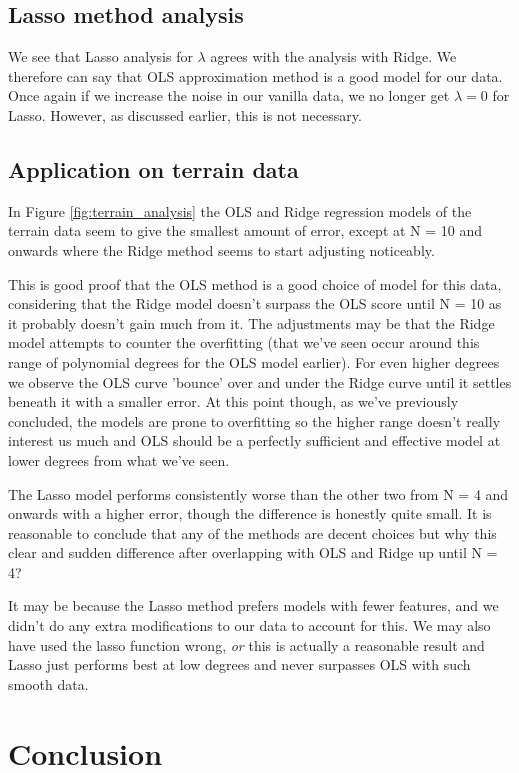 \documentclass[reprint,english,notitlepage]{revtex4-1}  %
\begin{document}
\subsection{Lasso method analysis}
We see that Lasso analysis for $\lambda$ agrees with the analysis with Ridge. We therefore can say that OLS approximation method is a good model for our data. Once again if we increase the noise in our vanilla data, we no longer get $\lambda = 0$ for Lasso. However, as discussed earlier, this is not necessary. 

\subsection{Application on terrain data}

In Figure \ref{fig:terrain_analysis} the OLS and Ridge regression models of the terrain data seem to give the smallest amount of error, except at N = 10 and onwards where the Ridge method seems to start adjusting noticeably.

This is good proof that the OLS method is a good choice of model for this data, considering that the Ridge model doesn't surpass the OLS score until N = 10 as it probably doesn't gain much from it. The adjustments may be that the Ridge model attempts to counter the overfitting (that we've seen occur around this range of polynomial degrees for the OLS model earlier). For even higher degrees we observe the OLS curve 'bounce' over and under the Ridge curve until it settles beneath it with a smaller error. At this point though, as we've previously concluded, the models are prone to overfitting so the higher range doesn't really interest us much and OLS should be a perfectly sufficient and effective model at lower degrees from what we've seen.

The Lasso model performs consistently worse than the other two from N = 4 and onwards with a higher error, though the difference is honestly quite small. It is reasonable to conclude that any of the methods are decent choices but why this clear and sudden difference after overlapping with OLS and Ridge up until N = 4? 

It may be because the Lasso method prefers models with fewer features, and we didn't do any extra modifications to our data to account for this. We may also have used the lasso function wrong, \textit{or} this is actually a reasonable result and Lasso just performs best at low degrees and never surpasses OLS with such smooth data.

\section{Conclusion}
\end{document}
